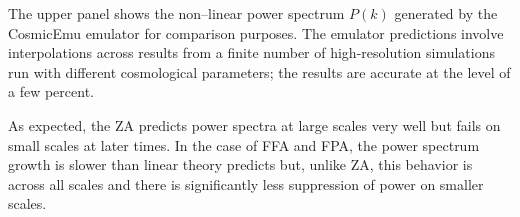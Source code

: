 The upper panel shows the non--linear power spectrum $P(k)$ generated by the CosmicEmu emulator \parencite{Heitmann:2015xma} for comparison purposes. The emulator predictions involve interpolations across results from a finite number of high-resolution simulations run with different cosmological parameters; the results are accurate at the level of a few percent.

As expected, the ZA predicts power spectra at large scales very well but fails on small scales at later times. In the case of FFA and FPA, the power spectrum growth is slower than linear theory predicts but, unlike ZA, this behavior is across all scales and there is significantly less suppression of power on smaller scales.